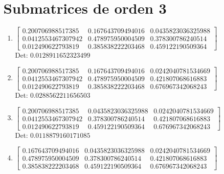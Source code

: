 \documentclass[12pt]{article}
\begin{document}
\section*{Submatrices de orden 3}

\begin{enumerate}

\item $\displaystyle \left[\begin{matrix}0.200706988517385 & 0.167643709494016 & 0.0435823036325988\\0.0412553467307942 & 0.478975950004509 & 0.378300786240514\\0.012490622793819 & 0.385838222203468 & 0.459122190509364\end{matrix}\right]$\\

Det: $0.0128911652323499$\\

\item $\displaystyle \left[\begin{matrix}0.200706988517385 & 0.167643709494016 & 0.0242040781534669\\0.0412553467307942 & 0.478975950004509 & 0.421807068616883\\0.012490622793819 & 0.385838222203468 & 0.676967342068243\end{matrix}\right]$\\

Det: $0.0288562211656503$\\

\item $\displaystyle \left[\begin{matrix}0.200706988517385 & 0.0435823036325988 & 0.0242040781534669\\0.0412553467307942 & 0.378300786240514 & 0.421807068616883\\0.012490622793819 & 0.459122190509364 & 0.676967342068243\end{matrix}\right]$\\

Det: $0.0118879160171085$\\

\item $\displaystyle \left[\begin{matrix}0.167643709494016 & 0.0435823036325988 & 0.0242040781534669\\0.478975950004509 & 0.378300786240514 & 0.421807068616883\\0.385838222203468 & 0.459122190509364 & 0.676967342068243\end{matrix}\right]$\\


\end{enumerate}
\end{document}
